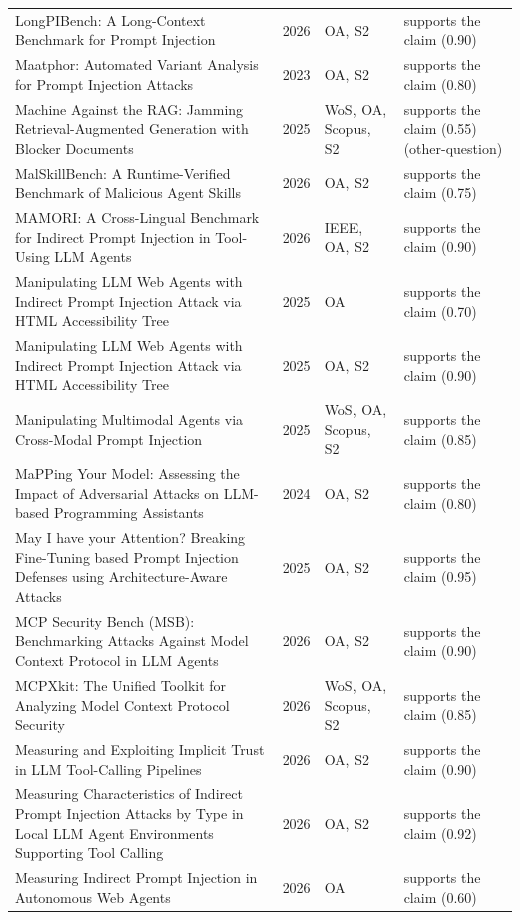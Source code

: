 \begin{longtable}{@{}%
  >{\raggedright\arraybackslash}p{}c%
  >{\raggedright\arraybackslash}p{}%
  >{\raggedright\arraybackslash}p{}@{}}
LongPIBench: A Long-Context Benchmark for Prompt Injection & 2026 & OA, S2 & supports the claim (0.90) \\
Maatphor: Automated Variant Analysis for Prompt Injection Attacks & 2023 & OA, S2 & supports the claim (0.80) \\
Machine Against the RAG: Jamming Retrieval-Augmented Generation with Blocker Documents & 2025 & WoS, OA, Scopus, S2 & supports the claim (0.55) (other-question) \\
MalSkillBench: A Runtime-Verified Benchmark of Malicious Agent Skills & 2026 & OA, S2 & supports the claim (0.75) \\
MAMORI: A Cross-Lingual Benchmark for Indirect Prompt Injection in Tool-Using LLM Agents & 2026 & IEEE, OA, S2 & supports the claim (0.90) \\
Manipulating LLM Web Agents with Indirect Prompt Injection Attack via HTML Accessibility Tree & 2025 & OA & supports the claim (0.70) \\
Manipulating LLM Web Agents with Indirect Prompt Injection Attack via HTML Accessibility Tree & 2025 & OA, S2 & supports the claim (0.90) \\
Manipulating Multimodal Agents via Cross-Modal Prompt Injection & 2025 & WoS, OA, Scopus, S2 & supports the claim (0.85) \\
MaPPing Your Model: Assessing the Impact of Adversarial Attacks on LLM-based Programming Assistants & 2024 & OA, S2 & supports the claim (0.80) \\
May I have your Attention? Breaking Fine-Tuning based Prompt Injection Defenses using Architecture-Aware Attacks & 2025 & OA, S2 & supports the claim (0.95) \\
MCP Security Bench (MSB): Benchmarking Attacks Against Model Context Protocol in LLM Agents & 2026 & OA, S2 & supports the claim (0.90) \\
MCPXkit: The Unified Toolkit for Analyzing Model Context Protocol Security & 2026 & WoS, OA, Scopus, S2 & supports the claim (0.85) \\
Measuring and Exploiting Implicit Trust in LLM Tool-Calling Pipelines & 2026 & OA, S2 & supports the claim (0.90) \\
Measuring Characteristics of Indirect Prompt Injection Attacks by Type in Local LLM Agent Environments Supporting Tool Calling & 2026 & OA, S2 & supports the claim (0.92) \\
Measuring Indirect Prompt Injection in Autonomous Web Agents & 2026 & OA & supports the claim (0.60) \\

\end{longtable}
